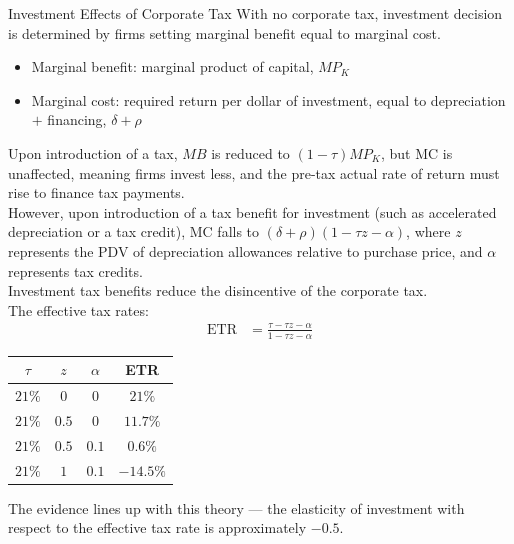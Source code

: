 \documentclass[10pt]{extarticle}
\begin{document}
  \begin{problem}{Investment Effects of Corporate Tax}
    With no corporate tax, investment decision is determined by firms setting marginal benefit equal to marginal cost.
    \begin{itemize}
      \item Marginal benefit: marginal product of capital, $MP_K$
      \item Marginal cost: required return per dollar of investment, equal to depreciation $+$ financing, $\delta + \rho$
    \end{itemize}
    Upon introduction of a tax, $MB$ is reduced to $(1-\tau)MP_K$, but MC is unaffected, meaning firms invest less, and the pre-tax actual rate of return must rise to finance tax payments.\\

    However, upon introduction of a tax benefit for investment (such as accelerated depreciation or a tax credit), MC falls to $(\delta + \rho)(1-\tau z - \alpha)$, where $z$ represents the PDV of depreciation allowances relative to purchase price, and $\alpha$ represents tax credits.\\

    Investment tax benefits reduce the disincentive of the corporate tax.\\

    The effective tax rates:
    \begin{align*}
      \text{ETR} &= \frac{\tau - \tau z - \alpha}{1 - \tau z - \alpha}
    \end{align*}
    \begin{center}
      \renewcommand{\arraystretch}{1.5}
      \begin{tabular}{c|c|c|c}
        $\tau$ & $z$ & $\alpha$ & ETR\\
        \hline
        $21\%$ & $0$ & $0$ & $21\%$\\
        $21\%$ & $0.5$ & $0$ & $11.7\%$\\
        $21\%$ & $0.5$ & $0.1$ & $0.6\%$\\
        $21\%$ & $1$ & $0.1$ & $-14.5\%$
      \end{tabular}
    \end{center}
    The evidence lines up with this theory --- the elasticity of investment with respect to the effective tax rate is approximately $-0.5$.
  \end{problem}
\end{document}
